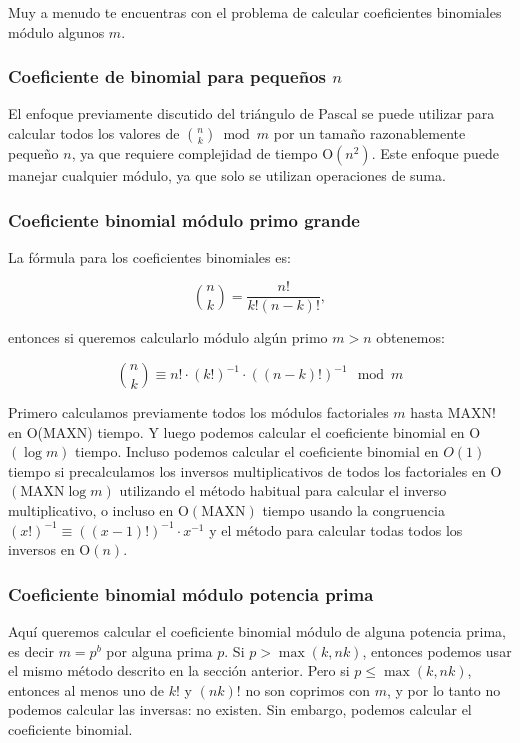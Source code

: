 Muy a menudo te encuentras con el problema de calcular coeficientes binomiales módulo algunos $m$.

\subsubsection{Coeficiente de binomial para pequeños $n$}

El enfoque previamente discutido del triángulo de Pascal se puede utilizar para calcular todos los valores de $\binom n  k  \bmod m$ por un tamaño razonablemente pequeño $n$, ya que requiere complejidad de tiempo O$(n^2)$. Este enfoque puede manejar cualquier módulo, ya que solo se utilizan operaciones de suma.

\subsubsection{Coeficiente binomial módulo primo grande}

La fórmula para los coeficientes binomiales es:

$$\binom n k = \frac {n!} {k!(n-k)!},$$

entonces si queremos calcularlo módulo algún primo $m > n$ obtenemos:

$$\binom n k \equiv n! \cdot (k!)^{-1} \cdot ((n-k)!)^{-1} \mod m$$

Primero calculamos previamente todos los módulos factoriales $m$ hasta $\text{MAXN}!$ en O($\text{MAXN}$) tiempo. Y luego podemos calcular el coeficiente binomial en O$(\log m)$ tiempo. 
Incluso podemos calcular el coeficiente binomial en $O(1)$ tiempo si precalculamos los inversos multiplicativos de todos los factoriales en O$(\text{MAXN} \log m)$ utilizando el método habitual 
para calcular el inverso multiplicativo, o incluso en O$(\text{MAXN})$ tiempo usando la congruencia $(x!)^{-1} \equiv ((x-1)!)^{-1} \cdot x^{-1}$ y el método para calcular todas todos los 
inversos en O$(n)$.

\subsubsection{Coeficiente binomial módulo potencia prima}

Aquí queremos calcular el coeficiente binomial módulo de alguna potencia prima, es decir $m = p^b$ por alguna prima $p$. Si $p > \max(k,nk)$, entonces podemos usar el mismo método descrito en la sección anterior. Pero si $p \le \max(k, nk)$, entonces al menos uno de $k!$ y $(nk)!$ no son coprimos con $m$, y por lo tanto no podemos calcular las inversas: no existen. Sin embargo, podemos calcular el coeficiente binomial.

